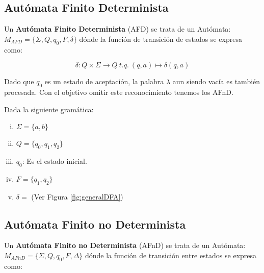 

\subsection{Autómata Finito Determinista}\label{sec:dfa}

Un \textbf{Autómata Finito Determinista} (AFD) se trata de un Autómata: $M_{AFD} = \{\Sigma, Q, q_0, F, \delta\}$ dónde la función de transición de estados se expresa como: 

\begin{equation}
\delta: Q \times \Sigma \longrightarrow Q\ t.q.\ (q, a) \longmapsto \delta (q, a)
\end{equation}

{\cor Dado que $q_0$ es un estado de aceptación, la palabra $\lambda$ aun siendo vacía es también procesada. Con el objetivo omitir este reconocimiento tenemos los AFnD.}

\ejem Dada la siguiente gramática:

\begin{enumerate}[i.]

\item $\Sigma = \{a,b\}$

\item $Q = \{q_0,q_1,q_2\}$

\item $q_0$: Es el estado inicial.

\item $F = \{q_1,q_2\}$

\item $\delta = $ (Ver Figura \ref{fig:generalDFA})

\end{enumerate}





\subsection{Autómata Finito no Determinista}\label{sec:nda}

Un \textbf{Autómata Finito no Determinista} (AFnD) se trata de un Autómata: $M_{AFnD} = \{\Sigma, Q, q_0, F, \Delta\}$ dónde la función de transición entre estados se expresa como:

